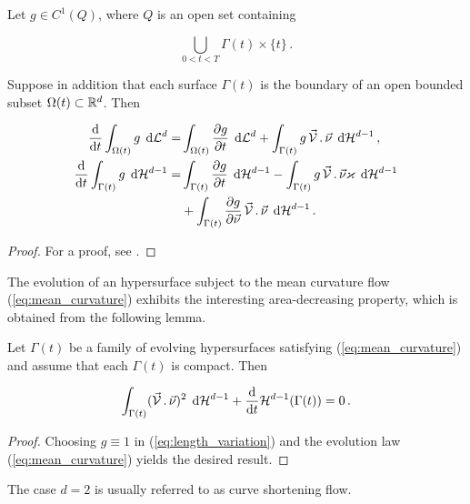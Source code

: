 \begin{lemma}
Let $g \in C^1(Q)$, where $Q$ is an open set containing

\begin{equation}
\bigcup_{0 < t < T} \Gamma(t) \times \{ t \} \, .
\end{equation}

Suppose in addition that each surface $\Gamma(t)$ is the boundary of an open
bounded subset $\Omega(t) \subset {\mathbb R}^{d}$. Then

\begin{align}
\frac{\rm d}{{\rm d}t} \int_{\Omega(t)} g \, \;{\rm d}{\cal L}^{d}  = &
\int_{\Omega(t)} \frac{\partial g}{\partial t} \, \;{\rm d}{\cal L}^{d}
+ \int_{\Gamma(t)} g \,\vec{\mathcal{V}}\,.\,\vec\nu \, \;{\rm d}{\cal H}^{d-1} \, ,
\label{eq:volume_variation} \\
\frac{\rm d}{{\rm d}t} \int_{\Gamma(t)} g \, \;{\rm d}{\cal H}^{d-1}  = &
\int_{\Gamma(t)} \frac{\partial g}{\partial t} \, \;{\rm d}{\cal H}^{d-1} -
\int_{\Gamma(t)} g \, \vec{\mathcal{V}}\,.\,\vec\nu \varkappa \, \;{\rm d}{\cal H}^{d-1}
\nonumber \\
& + \int_{\Gamma(t)} \frac{\partial g}{\partial \vec{\nu}}\,
\vec{\mathcal{V}}\,.\,\vec\nu \, \;{\rm d}{\cal H}^{d-1} \, .
\label{eq:length_variation}
\end{align}
\end{lemma}

\begin{proof}
For a proof, see \cite[\S~2.6, Lemma 2.1]{DeckelnickDE05}.
\end{proof}

The evolution of an hypersurface subject to the mean curvature flow
(\ref{eq:mean_curvature}) exhibits the interesting area-decreasing property,
which is obtained from the following lemma.

\begin{lemma}
Let $\Gamma(t)$ be a family of evolving hypersurfaces
satisfying (\ref{eq:mean_curvature}) and assume that each $\Gamma(t)$ is
compact. Then

\begin{equation}
\int_{\Gamma(t)} (\vec{\mathcal{V}}\,.\,\vec\nu)^2 \, \;{\rm d}{\cal H}^{d-1} +
\frac{\rm d}{{\rm d}t} \mathcal{H}^{d-1}(\Gamma(t)) = 0 \, . \label{eq:length_decrease}
\end{equation}

\end{lemma}

\begin{proof}
Choosing $g \equiv 1$ in (\ref{eq:length_variation}) and the evolution law
(\ref{eq:mean_curvature}) yields the desired result.
\end{proof}
The case $d = 2$ is usually referred to as curve shortening flow.

